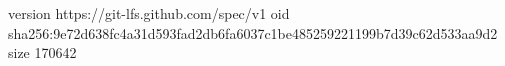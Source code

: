 version https://git-lfs.github.com/spec/v1
oid sha256:9e72d638fc4a31d593fad2db6fa6037c1be485259221199b7d39c62d533aa9d2
size 170642

